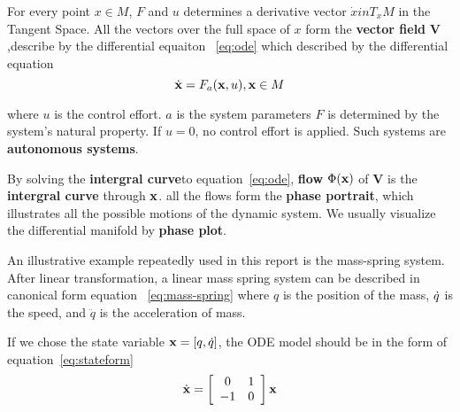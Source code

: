 For every point $x \in M$, 
$F$ and $u$ determines a derivative vector $\dot{x} in T_{x}M$ in the Tangent Space. 
All the vectors over the full space of $x$ form the \textbf{vector field} $\mathbf{V}$,describe by the differential equaiton~ \ref{eq:ode}
which described by the differential equation
\begin{equation}
\label{eq:ode}
\dot{\mathbf{x}}=F_a(\mathbf{x},u),\mathbf{x}\in M
\end{equation}

where $u$ is the control effort. 
$a$ is the system parameters
$F$ is determined by the system's natural property.
If $u=0$,  no control effort is applied.
Such systems are \textbf{autonomous systems}. 

By solving the \textbf{intergral curve}to equation~\ref{eq:ode}, 
\textbf{flow} $\Phi(\mathbf{x})$ of $\mathbf{V}$ is the \textbf{intergral curve} through $\mathbf{x}$. 
all the flows form the \textbf{phase portrait}, which illustrates all the possible motions of the dynamic system.
We usually visualize the differential manifold by \textbf{phase plot}.


An illustrative example repeatedly used in this report is the mass-spring system. 
After linear transformation,  
a linear mass spring system can be described in canonical form equation ~\ref{eq:mass-spring}
where $q$ is the position of the mass, $\dot{q}$ is the speed, and $\ddot{q}$ is the acceleration of mass.
 
If we chose the state variable $\mathbf{x}=[q,\dot{q}]$, the ODE model should be in the form of equation~\ref{eq:stateform}
\begin{equation}
\label{eq:stateform}
\dot{\mathbf{x}}=
\left[ 
\begin{array}{cc}
0 &1\\
-1 &0 
\end{array}
\right]\mathbf{x}
\end{equation}



